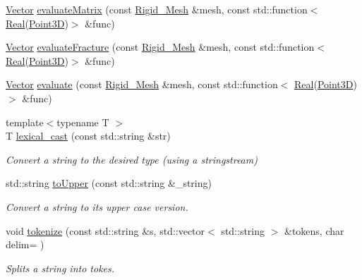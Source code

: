\begin{DoxyCompactItemize}
\hyperlink{namespaceFVCode3D_a16ccf345652402bccd1a5d2e6782526c}{Vector} \hyperlink{namespaceFVCode3D_a3d3cdaa3f99983f1aa2d079caded2585}{evaluate\+Matrix} (const \hyperlink{classFVCode3D_1_1Rigid__Mesh}{Rigid\+\_\+\+Mesh} \&mesh, const std\+::function$<$ \hyperlink{namespaceFVCode3D_a40c1f5588a248569d80aa5f867080e83}{Real}(\hyperlink{classFVCode3D_1_1Point3D}{Point3D})$>$ \&func)
\item 
\hyperlink{namespaceFVCode3D_a16ccf345652402bccd1a5d2e6782526c}{Vector} \hyperlink{namespaceFVCode3D_a9d3700c347e26f9a442a95785abceac6}{evaluate\+Fracture} (const \hyperlink{classFVCode3D_1_1Rigid__Mesh}{Rigid\+\_\+\+Mesh} \&mesh, const std\+::function$<$ \hyperlink{namespaceFVCode3D_a40c1f5588a248569d80aa5f867080e83}{Real}(\hyperlink{classFVCode3D_1_1Point3D}{Point3D})$>$ \&func)
\item 
\hyperlink{namespaceFVCode3D_a16ccf345652402bccd1a5d2e6782526c}{Vector} \hyperlink{namespaceFVCode3D_a113366cb939ded701e04649337315295}{evaluate} (const \hyperlink{classFVCode3D_1_1Rigid__Mesh}{Rigid\+\_\+\+Mesh} \&mesh, const std\+::function$<$ \hyperlink{namespaceFVCode3D_a40c1f5588a248569d80aa5f867080e83}{Real}(\hyperlink{classFVCode3D_1_1Point3D}{Point3D})$>$ \&func)
\item 
{\footnotesize template$<$typename T $>$ }\\T \hyperlink{namespaceFVCode3D_a7d8605df83383ec5cf62f7efe480a68a}{lexical\+\_\+cast} (const std\+::string \&str)
\begin{DoxyCompactList}\small\item\em Convert a string to the desired type (using a stringstream) \end{DoxyCompactList}\item 
std\+::string \hyperlink{namespaceFVCode3D_aab0ceb729c2ff3e7fd288097aee76a59}{to\+Upper} (const std\+::string \&\+\_\+string)
\begin{DoxyCompactList}\small\item\em Convert a string to its upper case version. \end{DoxyCompactList}\item 
void \hyperlink{namespaceFVCode3D_a7bd098182831904c8fcd227b9d0f4562}{tokenize} (const std\+::string \&s, std\+::vector$<$ std\+::string $>$ \&tokens, char delim= \textquotesingle{} \textquotesingle{})
\begin{DoxyCompactList}\small\item\em Splits a string into tokes. \end{DoxyCompactList}\end{DoxyCompactItemize}
